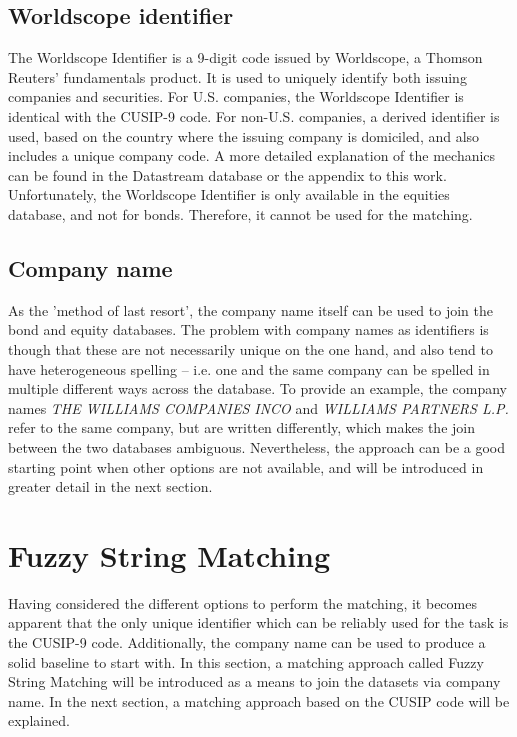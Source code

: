 \subsection{Worldscope identifier} %
The Worldscope Identifier is a 9-digit code issued by Worldscope, a Thomson Reuters' fundamentals product. It is used to uniquely identify both issuing companies and securities. For U.S. companies, the Worldscope Identifier is identical with the CUSIP-9 code. For non-U.S. companies, a derived identifier is used, based on the country where the issuing company is domiciled, and also includes a unique company code. A more detailed explanation of the mechanics can be found in the Datastream database or the appendix to this work. %
Unfortunately, the Worldscope Identifier is only available in the equities database, and not for bonds. Therefore, it cannot be used for the matching. 

\subsection{Company name}
As the 'method of last resort', the company name itself can be used to join the bond and equity databases. The problem with company names as identifiers is though that these are not necessarily unique on the one hand, and also tend to have heterogeneous spelling -- i.e. one and the same company can be spelled in multiple different ways across the database. To provide an example, the company names \textit{THE WILLIAMS COMPANIES INCO} and \textit{WILLIAMS PARTNERS L.P.} refer to the same company, but are written differently, which makes the join between the two databases ambiguous. Nevertheless, the approach can be a good starting point when other options are not available, and will be introduced in greater detail in the next section. 

\section{Fuzzy String Matching} \label{section:fuzzy-string-matching}
Having considered the different options to perform the matching, it becomes apparent that the only unique identifier which can be reliably used for the task is the CUSIP-9 code. Additionally, the company name can be used to produce a solid baseline to start with. In this section, a matching approach called Fuzzy String Matching will be introduced as a means to join the datasets via company name. In the next section, a matching approach based on the CUSIP code will be explained. 

